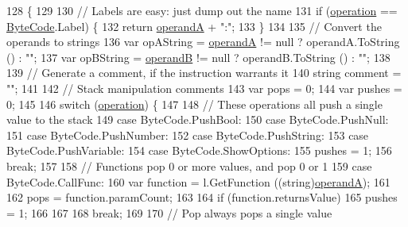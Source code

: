 \begin{DoxyCode}
128                                                       \{
129 
130             \textcolor{comment}{// Labels are easy: just dump out the name}
131             \textcolor{keywordflow}{if} (\hyperlink{a00044_a566bf5f7198cc353ea5c3710cb3a31cb}{operation} == \hyperlink{a00026_ad5dfb6ee68ca7469623ad3e459f98894}{ByteCode}.Label) \{
132                 \textcolor{keywordflow}{return} \hyperlink{a00044_ab5d386faa0d3dbc23db80f8e62706afd}{operandA} + \textcolor{stringliteral}{":"};
133             \}
134 
135             \textcolor{comment}{// Convert the operands to strings}
136             var opAString = \hyperlink{a00044_ab5d386faa0d3dbc23db80f8e62706afd}{operandA} != null ? operandA.ToString () : \textcolor{stringliteral}{""};
137             var opBString = \hyperlink{a00044_a56348c6fe7eb919b7277afc06e5b224a}{operandB} != null ? operandB.ToString () : \textcolor{stringliteral}{""};
138 
139             \textcolor{comment}{// Generate a comment, if the instruction warrants it}
140             \textcolor{keywordtype}{string} comment = \textcolor{stringliteral}{""};
141 
142             \textcolor{comment}{// Stack manipulation comments}
143             var pops = 0;
144             var pushes = 0;
145 
146             \textcolor{keywordflow}{switch} (\hyperlink{a00044_a566bf5f7198cc353ea5c3710cb3a31cb}{operation}) \{
147 
148             \textcolor{comment}{// These operations all push a single value to the stack}
149             \textcolor{keywordflow}{case} ByteCode.PushBool:
150             \textcolor{keywordflow}{case} ByteCode.PushNull:
151             \textcolor{keywordflow}{case} ByteCode.PushNumber:
152             \textcolor{keywordflow}{case} ByteCode.PushString:
153             \textcolor{keywordflow}{case} ByteCode.PushVariable:
154             \textcolor{keywordflow}{case} ByteCode.ShowOptions:
155                 pushes = 1;
156                 \textcolor{keywordflow}{break};
157 
158             \textcolor{comment}{// Functions pop 0 or more values, and pop 0 or 1 }
159             \textcolor{keywordflow}{case} ByteCode.CallFunc:
160                 var \textcolor{keyword}{function} = l.GetFunction ((string)\hyperlink{a00044_ab5d386faa0d3dbc23db80f8e62706afd}{operandA});
161 
162                 pops = function.paramCount;
163 
164                 \textcolor{keywordflow}{if} (\textcolor{keyword}{function}.returnsValue)
165                     pushes = 1;
166                 
167 
168                 \textcolor{keywordflow}{break};
169             
170             \textcolor{comment}{// Pop always pops a single value}

\end{DoxyCode}

